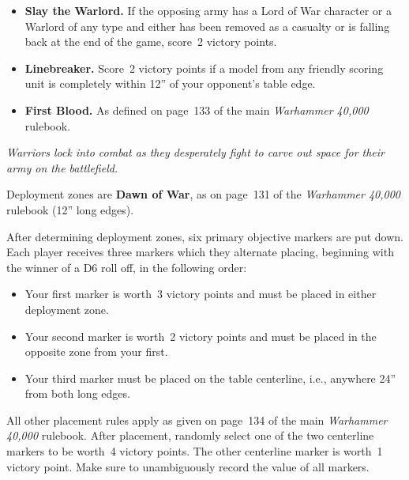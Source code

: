 \documentclass{40k}
\begin{document}
\begin{itemize}
\item \textbf{Slay the Warlord.}  If the opposing army has a Lord of
  War character or a Warlord of any type and either has been removed
  as a casualty or is falling back at the end of the game, score~2
  victory points.

\item \textbf{Linebreaker.}  Score~2 victory points if a model from
  any friendly scoring unit is completely within 12'' of your
  opponent's table edge.

\item \textbf{First Blood.}  As defined on page~133 of the main
  \emph{Warhammer 40,000} rulebook.
\end{itemize}



\centerline{\emph{Warriors lock into combat as they desperately fight
    to carve out space for their army on the battlefield.}}


Deployment zones are \textbf{Dawn of War}, as on page~131 of the
\emph{Warhammer 40,000} rulebook (12'' long edges).

\bigskip%
After determining deployment zones, six primary objective markers are
put down.  Each player receives three markers which they alternate
placing, beginning with the winner of a D6 roll off, in the following
order:

\begin{itemize}
\item Your first marker is worth~3 victory points and must be placed
  in either deployment zone.

\item Your second marker is worth~2 victory points and must be placed
  in the opposite zone from your first.

\item Your third marker must be placed on the table centerline, i.e.,
  anywhere 24'' from both long edges.
\end{itemize}

All other placement rules apply as given on page~134 of the main
\emph{Warhammer 40,000} rulebook.  After placement, randomly select
one of the two centerline markers to be worth~4 victory points.  The
other centerline marker is worth~1 victory point.  Make sure to
unambiguously record the value of all markers.
\end{document}
